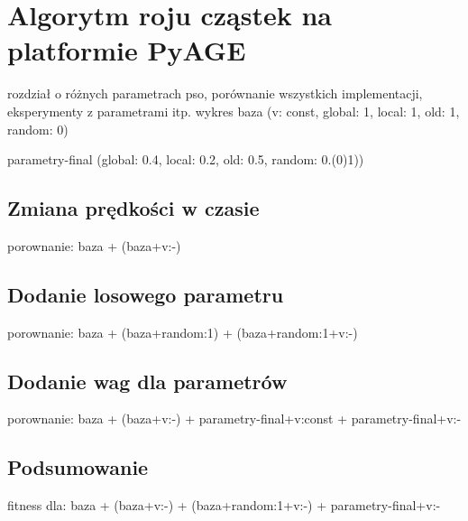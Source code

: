 \chapter{Algorytm roju cząstek na platformie PyAGE}
\label{cha:psoTesty}



rozdział o różnych parametrach pso, porównanie wszystkich implementacji, eksperymenty z parametrami itp.
wykres baza (v: const, global: 1, local: 1, old: 1, random: 0)

parametry-final (global: 0.4, local: 0.2, old: 0.5, random: 0.(0)1))

\section{Zmiana prędkości w czasie}
porownanie: baza + (baza+v:-)


\section{Dodanie losowego parametru}
porownanie: baza + (baza+random:1) + (baza+random:1+v:-)


\section{Dodanie wag dla parametrów}
porownanie: baza + (baza+v:-) + parametry-final+v:const  + parametry-final+v:-


\section{Podsumowanie}
fitness dla:
baza + (baza+v:-) + (baza+random:1+v:-) + parametry-final+v:-






